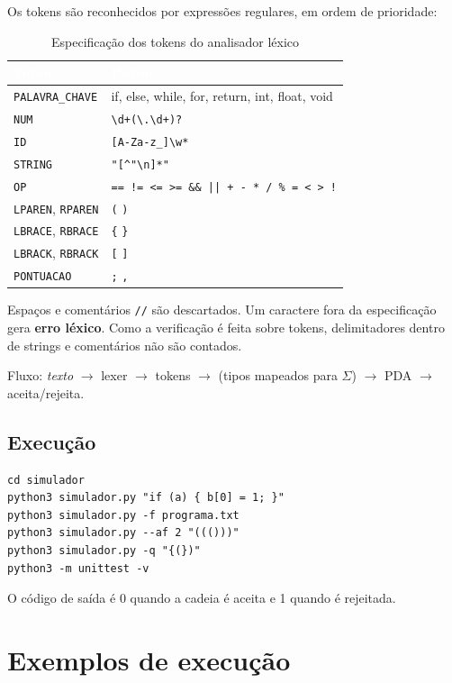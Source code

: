 \documentclass[12pt,a4paper]{article}
\newcommand{\cab}[1]{\textcolor{white}{\bfseries #1}}
\newcommand{\fonte}{\par\vspace{3pt}{\footnotesize Fonte: elaborado por Cauan.}\par\vspace{6pt}}
\begin{document}
Os tokens são reconhecidos por expressões regulares, em ordem de prioridade:
\begin{table}[htbp]
\centering
\small
\caption{Especificação dos tokens do analisador léxico}
\begin{tabular}{|>{\raggedright\arraybackslash}p{4cm}|>{\raggedright\arraybackslash}p{8cm}|}
\hline
\rowcolor{cabecalho} \cab{Token} & \cab{Padrão} \\ \hline
\texttt{PALAVRA\_CHAVE} & if, else, while, for, return, int, float, void \\ \hline
\rowcolor{faixa} \texttt{NUM} & \verb|\d+(\.\d+)?| \\ \hline
\texttt{ID} & \verb|[A-Za-z_]\w*| \\ \hline
\rowcolor{faixa} \texttt{STRING} & \verb|"[^"\n]*"| \\ \hline
\texttt{OP} & \verb~== != <= >= && || + - * / % = < > !~ \\ \hline
\rowcolor{faixa} \texttt{LPAREN}, \texttt{RPAREN} & \verb|(| \quad \verb|)| \\ \hline
\texttt{LBRACE}, \texttt{RBRACE} & \verb|{| \quad \verb|}| \\ \hline
\rowcolor{faixa} \texttt{LBRACK}, \texttt{RBRACK} & \verb|[| \quad \verb|]| \\ \hline
\texttt{PONTUACAO} & \verb|;| \quad \verb|,| \\ \hline
\end{tabular}
\fonte
\end{table}
Espaços e comentários \texttt{//} são descartados. Um caractere fora da especificação gera \textbf{erro léxico}. Como a verificação é feita sobre tokens, delimitadores dentro de strings e comentários não são contados.

Fluxo: \emph{texto} $\rightarrow$ lexer $\rightarrow$ tokens $\rightarrow$ (tipos mapeados para $\Sigma$) $\rightarrow$ PDA $\rightarrow$ aceita/rejeita.

\subsection*{Execução}
\begin{Verbatim}[fontsize=\small]
cd simulador
python3 simulador.py "if (a) { b[0] = 1; }"
python3 simulador.py -f programa.txt
python3 simulador.py --af 2 "((()))"
python3 simulador.py -q "{(})"
python3 -m unittest -v
\end{Verbatim}
O código de saída é 0 quando a cadeia é aceita e 1 quando é rejeitada.

\section{Exemplos de execução}
\end{document}
